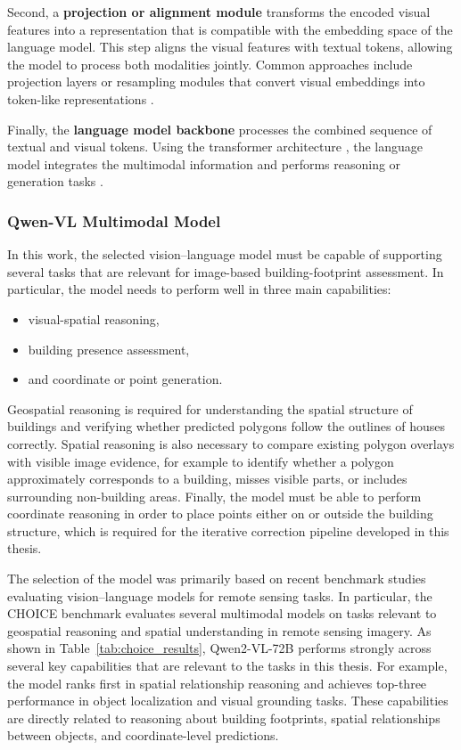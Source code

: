 Second, a \textbf{projection or alignment module} transforms the encoded visual features into a representation that is compatible with the embedding space of the language model. 
This step aligns the visual features with textual tokens, allowing the model to process both modalities jointly. 
Common approaches include projection layers or resampling modules that convert visual embeddings into token-like representations \citep{liang2025comprehensivesurveyguidemultimodal}.

Finally, the \textbf{language model backbone} processes the combined sequence of textual and visual tokens. Using the transformer architecture \citep{VaswaniTransformerBase}, the language model integrates the multimodal information and performs reasoning or generation tasks \citep{liang2025comprehensivesurveyguidemultimodal}.

\subsubsection{Qwen-VL Multimodal Model}

In this work, the selected vision–language model must be capable of supporting several tasks that are relevant for image-based building-footprint assessment. In particular, the model needs to perform well in three main capabilities:
\begin{itemize}
    \item visual-spatial reasoning,
    \item building presence assessment,
    \item and coordinate or point generation.
\end{itemize}

Geospatial reasoning is required for understanding the spatial structure of buildings and verifying whether predicted polygons follow the outlines of houses correctly. Spatial reasoning is also necessary to compare existing polygon overlays with visible image evidence, for example to identify whether a polygon approximately corresponds to a building, misses visible parts, or includes surrounding non-building areas. Finally, the model must be able to perform coordinate reasoning in order to place points either on or outside the building structure, which is required for the iterative correction pipeline developed in this thesis.

The selection of the model was primarily based on recent benchmark studies evaluating vision–language models for remote sensing tasks. In particular, the CHOICE benchmark \citep{an2025choicebenchmarkingremotesensing} evaluates several multimodal models on tasks relevant to geospatial reasoning and spatial understanding in remote sensing imagery. As shown in Table~\ref{tab:choice_results}, Qwen2-VL-72B performs strongly across several key capabilities that are relevant to the tasks in this thesis. For example, the model ranks first in spatial relationship reasoning and achieves top-three performance in object localization and visual grounding tasks. These capabilities are directly related to reasoning about building footprints, spatial relationships between objects, and coordinate-level predictions.


